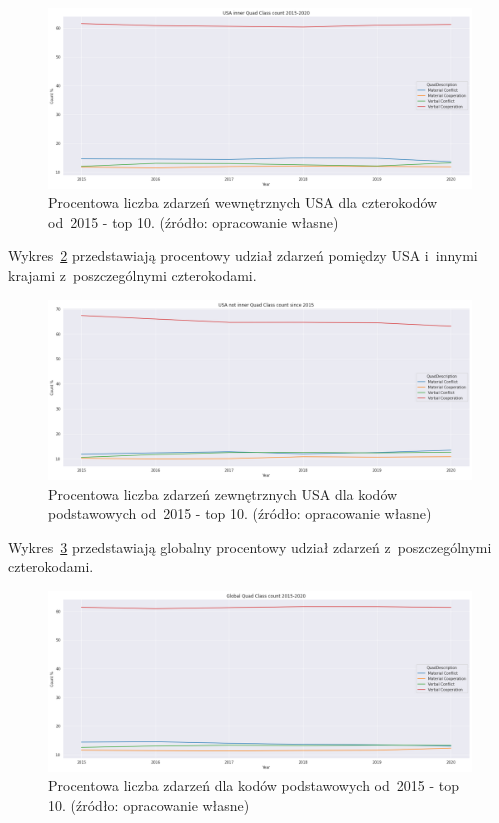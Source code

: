 \documentclass[11pt]{report}
\begin{document}
    \begin{figure}[tp]
        \centering
        \includegraphics[width=\linewidth]{fig/USA inner/QCperc.png}
        \caption{Procentowa liczba zdarzeń wewnętrznych USA dla czterokodów od~2015 - top 10. (źródło: opracowanie własne)}
        \label{fig:USA_inner_QCperc}
    \end{figure}

    Wykres~\ref{fig:USA_not_inner_QCperc} przedstawiają procentowy udział zdarzeń pomiędzy USA i~innymi krajami z~poszczególnymi czterokodami.

    \begin{figure}[tp]
        \centering
        \includegraphics[width=\linewidth]{fig/USA not inner/QCperc.png}
        \caption{Procentowa liczba zdarzeń zewnętrznych USA dla kodów podstawowych od~2015 - top 10. (źródło: opracowanie własne)}
        \label{fig:USA_not_inner_QCperc}
    \end{figure}

    Wykres~\ref{fig:GLOBAL_QCperc} przedstawiają globalny procentowy udział zdarzeń z~poszczególnymi czterokodami.

    \begin{figure}[tp]
        \centering
        \includegraphics[width=\linewidth]{fig/GLOBAL/QCperc.png}
        \caption{Procentowa liczba zdarzeń dla kodów podstawowych od~2015 - top 10. (źródło: opracowanie własne)}
        \label{fig:GLOBAL_QCperc}
    \end{figure}
\end{document}
